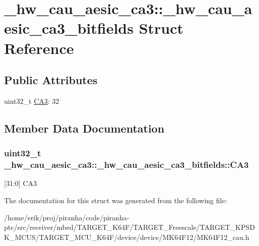 \hypertarget{struct__hw__cau__aesic__ca3_1_1__hw__cau__aesic__ca3__bitfields}{}\section{\+\_\+hw\+\_\+cau\+\_\+aesic\+\_\+ca3\+:\+:\+\_\+hw\+\_\+cau\+\_\+aesic\+\_\+ca3\+\_\+bitfields Struct Reference}
\label{struct__hw__cau__aesic__ca3_1_1__hw__cau__aesic__ca3__bitfields}
\subsection*{Public Attributes}
\begin{DoxyCompactItemize}
\item 
uint32\+\_\+t \hyperlink{struct__hw__cau__aesic__ca3_1_1__hw__cau__aesic__ca3__bitfields_af4c4309f2fb55ca01ed36ec5705a28fd}{C\+A3}\+: 32
\end{DoxyCompactItemize}


\subsection{Member Data Documentation}
\subsubsection[{\texorpdfstring{C\+A3}{CA3}}]{\setlength{\rightskip}{0pt plus 5cm}uint32\+\_\+t \+\_\+hw\+\_\+cau\+\_\+aesic\+\_\+ca3\+::\+\_\+hw\+\_\+cau\+\_\+aesic\+\_\+ca3\+\_\+bitfields\+::\+C\+A3}\hypertarget{struct__hw__cau__aesic__ca3_1_1__hw__cau__aesic__ca3__bitfields_af4c4309f2fb55ca01ed36ec5705a28fd}{}\label{struct__hw__cau__aesic__ca3_1_1__hw__cau__aesic__ca3__bitfields_af4c4309f2fb55ca01ed36ec5705a28fd}
\mbox{[}31\+:0\mbox{]} C\+A3 

The documentation for this struct was generated from the following file\+:\begin{DoxyCompactItemize}
\item 
/home/erik/proj/piranha/code/piranha-\/ptc/src/receiver/mbed/\+T\+A\+R\+G\+E\+T\+\_\+\+K64\+F/\+T\+A\+R\+G\+E\+T\+\_\+\+Freescale/\+T\+A\+R\+G\+E\+T\+\_\+\+K\+P\+S\+D\+K\+\_\+\+M\+C\+U\+S/\+T\+A\+R\+G\+E\+T\+\_\+\+M\+C\+U\+\_\+\+K64\+F/device/device/\+M\+K64\+F12/M\+K64\+F12\+\_\+cau.\+h\end{DoxyCompactItemize}
